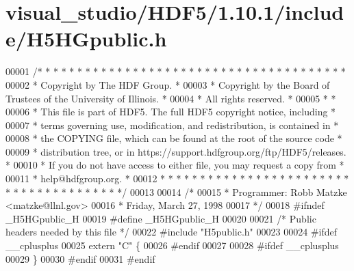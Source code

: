 \hypertarget{visual__studio_2_h_d_f5_21_810_81_2include_2_h5_h_gpublic_8h_source}{}\section{visual\+\_\+studio/\+H\+D\+F5/1.10.1/include/\+H5\+H\+Gpublic.h}
\label{visual__studio_2_h_d_f5_21_810_81_2include_2_h5_h_gpublic_8h_source}

\begin{DoxyCode}
00001 \textcolor{comment}{/* * * * * * * * * * * * * * * * * * * * * * * * * * * * * * * * * * * * * * *}
00002 \textcolor{comment}{ * Copyright by The HDF Group.                                               *}
00003 \textcolor{comment}{ * Copyright by the Board of Trustees of the University of Illinois.         *}
00004 \textcolor{comment}{ * All rights reserved.                                                      *}
00005 \textcolor{comment}{ *                                                                           *}
00006 \textcolor{comment}{ * This file is part of HDF5.  The full HDF5 copyright notice, including     *}
00007 \textcolor{comment}{ * terms governing use, modification, and redistribution, is contained in    *}
00008 \textcolor{comment}{ * the COPYING file, which can be found at the root of the source code       *}
00009 \textcolor{comment}{ * distribution tree, or in https://support.hdfgroup.org/ftp/HDF5/releases.  *}
00010 \textcolor{comment}{ * If you do not have access to either file, you may request a copy from     *}
00011 \textcolor{comment}{ * help@hdfgroup.org.                                                        *}
00012 \textcolor{comment}{ * * * * * * * * * * * * * * * * * * * * * * * * * * * * * * * * * * * * * * */}
00013 
00014 \textcolor{comment}{/*}
00015 \textcolor{comment}{ * Programmer:  Robb Matzke <matzke@llnl.gov>}
00016 \textcolor{comment}{ *              Friday, March 27, 1998}
00017 \textcolor{comment}{ */}
00018 \textcolor{preprocessor}{#ifndef \_H5HGpublic\_H}
00019 \textcolor{preprocessor}{#define \_H5HGpublic\_H}
00020 
00021 \textcolor{comment}{/* Public headers needed by this file */}
00022 \textcolor{preprocessor}{#include "H5public.h"}
00023 
00024 \textcolor{preprocessor}{#ifdef \_\_cplusplus}
00025 \textcolor{keyword}{extern} \textcolor{stringliteral}{"C"} \{
00026 \textcolor{preprocessor}{#endif}
00027 
00028 \textcolor{preprocessor}{#ifdef \_\_cplusplus}
00029 \}
00030 \textcolor{preprocessor}{#endif}
00031 \textcolor{preprocessor}{#endif}
\end{DoxyCode}
